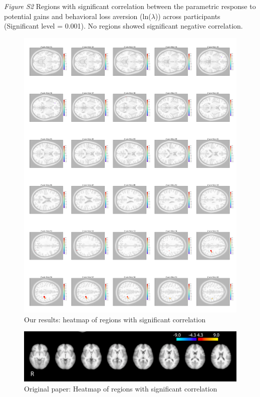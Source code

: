 \documentclass[11pt]{article}
\begin{document}
\emph{Figure S2} Regions with significant correlation between the parametric 
response to potential gains and behavioral loss aversion (ln($\lambda$)) across 
participants (Significant level = 0.001).  No regions showed significant 
negative correlation.

\begin{figure}[H]\label{sig_cor_z_gain}
    \centering
        \includegraphics[scale=0.105]{figures/Regression3/sig_cor_z_gain.png}
    \caption{Our results: heatmap of regions with significant correlation}
\end{figure}

\begin{figure}[H]
    \centering
        \includegraphics[scale=0.5]{figures/Regression3/Orig_sig_cor_z_gain.png}
    \caption{Original paper: Heatmap of regions with significant correlation}
\end{figure}
\end{document}
